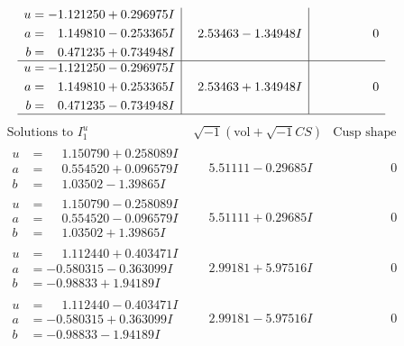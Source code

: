 \documentclass[1p]{elsarticle_modified}
\theoremstyle{definition}
\newcommand{\I}{\sqrt{-1}}
\begin{document}
$$\begin{array}{c|c|c}
\begin{aligned}
u &= -1.121250 + 0.296975 I \\
a &= \phantom{-}1.149810 - 0.253365 I \\
b &= \phantom{-}0.471235 + 0.734948 I\end{aligned}
 & \phantom{-}2.53463 - 1.34948 I & \phantom{-0.000000 } 0 \\ \hline\begin{aligned}
u &= -1.121250 - 0.296975 I \\
a &= \phantom{-}1.149810 + 0.253365 I \\
b &= \phantom{-}0.471235 - 0.734948 I\end{aligned}
 & \phantom{-}2.53463 + 1.34948 I & \phantom{-0.000000 } 0\\
 \hline 
 \end{array}$$\newpage$$\begin{array}{c|c|c}  
\text{Solutions to }I^u_{1}& \I (\text{vol} + \sqrt{-1}CS) & \text{Cusp shape}\\
 \hline 
\begin{aligned}
u &= \phantom{-}1.150790 + 0.258089 I \\
a &= \phantom{-}0.554520 + 0.096579 I \\
b &= \phantom{-}1.03502 - 1.39865 I\end{aligned}
 & \phantom{-}5.51111 - 0.29685 I & \phantom{-0.000000 } 0 \\ \hline\begin{aligned}
u &= \phantom{-}1.150790 - 0.258089 I \\
a &= \phantom{-}0.554520 - 0.096579 I \\
b &= \phantom{-}1.03502 + 1.39865 I\end{aligned}
 & \phantom{-}5.51111 + 0.29685 I & \phantom{-0.000000 } 0 \\ \hline\begin{aligned}
u &= \phantom{-}1.112440 + 0.403471 I \\
a &= -0.580315 - 0.363099 I \\
b &= -0.98833 + 1.94189 I\end{aligned}
 & \phantom{-}2.99181 + 5.97516 I & \phantom{-0.000000 } 0 \\ \hline\begin{aligned}
u &= \phantom{-}1.112440 - 0.403471 I \\
a &= -0.580315 + 0.363099 I \\
b &= -0.98833 - 1.94189 I\end{aligned}
 & \phantom{-}2.99181 - 5.97516 I & \phantom{-0.000000 } 0 \\ \hline\begin{aligned}

\end{aligned}
\end{array}$$
\end{document}
